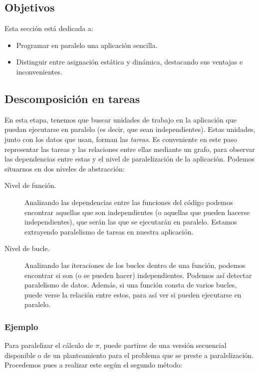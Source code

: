 \subsection{Objetivos}
Esta sección está dedicada a:
\begin{itemize}
    \item Programar en paralelo una aplicación sencilla.
    \item Distinguir entre asignación estática y dinámica, destacando sus ventajas e inconvenientes.
\end{itemize}

\subsection{Descomposición en tareas} 
En esta etapa, tenemos que buscar unidades de trabajo en la aplicación que puedan ejecutarse en paralelo (es decir, que sean independientes). Estas unidades, junto con los datos que usan, forman las \emph{tareas}. Es conveniente en este paso representar las tareas y las relaciones entre ellas mediante un grafo, para observar las dependencias entre estas y el nivel de paralelización de la aplicación. Podemos situarnos en dos niveles de abstracción:
\begin{description}
    \item [Nivel de función.] Analizando las dependencias entre las funciones del código podemos encontrar aquellas que son independientes (o aquellas que pueden hacerse independientes), que serán las que se ejecutarán en paralelo. Estamos extrayendo paralelismo de tareas en nuestra aplicación.
    \item [Nivel de bucle.] Analizando las iteraciones de los bucles dentro de una función, podemos encontrar si son (o se pueden hacer) independientes. Podemos así detectar paralelismo de datos. Además, si una función consta de varios bucles, puede verse la relación entre estos, para así ver si pueden ejecutarse en paralelo.
\end{description}

\subsubsection{Ejemplo} 
Para paralelizar el cálculo de $\pi$, puede partirse de una versión secuencial disponible o de un planteamiento para el problema que se preste a paralelización. Procedemos pues a realizar este según el segundo método:

